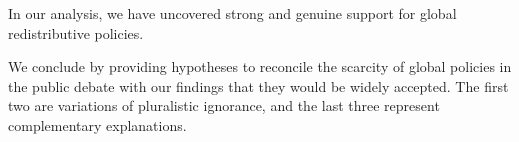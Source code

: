 
In our analysis, we have uncovered strong and genuine support for global redistributive policies. %

We conclude by providing hypotheses to reconcile the scarcity of global policies in the public debate with our findings that they would be widely accepted. %
The first two are variations of pluralistic ignorance, and the last three represent complementary explanations. 

